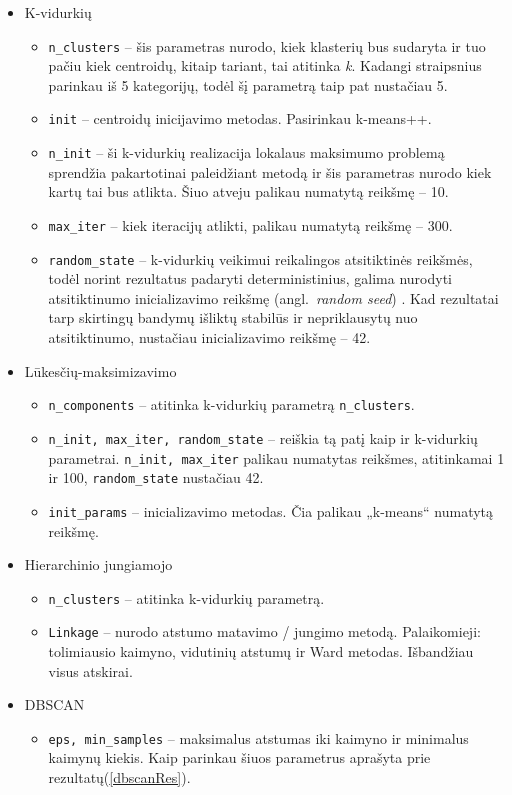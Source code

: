 \documentclass{VUMIFInfKursinis}
\newcommand{\ltang}[2]{#1 (angl.\  \textit{#2}) }
\begin{document}
\begin{itemize}
\item
  K-vidurkių

  \begin{itemize}
    \item
    \texttt{n\_clusters} – šis parametras nurodo, kiek klasterių bus
    sudaryta ir tuo pačiu kiek centroidų, kitaip tariant, tai atitinka
    \textit{k}. Kadangi straipsnius parinkau iš 5 kategorijų, todėl šį
    parametrą taip pat nustačiau 5.
  \item
    \texttt{init} – centroidų inicijavimo metodas. Pasirinkau
    k-means++.
  \item
    \texttt{n\_init} – ši k-vidurkių realizacija lokalaus maksimumo
    problemą sprendžia pakartotinai paleidžiant metodą ir šis parametras
    nurodo kiek kartų tai bus atlikta. Šiuo atveju palikau numatytą
    reikšmę – 10.
  \item
    \texttt{max\_iter} – kiek iteracijų atlikti, palikau numatytą
    reikšmę – 300.
  \item
    \texttt{random\_state} – k-vidurkių veikimui reikalingos
    atsitiktinės reikšmės, todėl norint rezultatus padaryti
    deterministinius, galima nurodyti \ltang{atsitiktinumo inicializavimo
    reikšmę}{random seed}. Kad rezultatai tarp skirtingų
    bandymų išliktų stabilūs ir nepriklausytų nuo atsitiktinumo,
    nustačiau inicializavimo reikšmę – 42.
  \end{itemize}
\item
  Lūkesčių-maksimizavimo

  \begin{itemize}
    \item
    \texttt{n\_components} – atitinka k-vidurkių parametrą
    \texttt{n\_clusters}.
  \item
    \texttt{n\_init, max\_iter, random\_state}
    – reiškia tą patį kaip ir k-vidurkių parametrai. \texttt{n\_init,
    max\_iter} palikau numatytas reikšmes, atitinkamai 1 ir
    100, \texttt{random\_state} nustačiau 42.
  \item
    \texttt{init\_params} – inicializavimo metodas. Čia palikau
    „k-means“ numatytą reikšmę.
  \end{itemize}
\item
  Hierarchinio jungiamojo

  \begin{itemize}
    \item
    \texttt{n\_clusters} – atitinka k-vidurkių parametrą.
  \item
  	\texttt{Linkage} –
    nurodo atstumo matavimo /
    jungimo metodą. Palaikomieji: tolimiausio
    kaimyno, vidutinių atstumų ir Ward
    metodas. Išbandžiau visus atskirai.
  \end{itemize}
\item
  DBSCAN

  \begin{itemize}
    \item
    \texttt{eps, min\_samples} –
    maksimalus atstumas iki kaimyno ir
    minimalus kaimynų
    kiekis. Kaip parinkau šiuos parametrus aprašyta
    prie rezultatų(\ref{dbscanRes}).
  \end{itemize}
\end{itemize}
\end{document}

